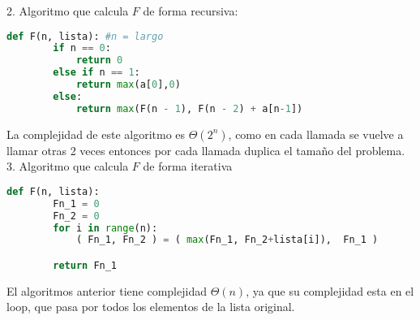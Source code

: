 \documentclass[
	spanish, %
	letterpaper, oneside
]{article}
\begin{document}
2. Algoritmo que calcula $F$ de forma recursiva:

\begin{lstlisting}[language=Python]
    def F(n, lista): #n = largo
        if n == 0:
            return 0
        else if n == 1:
            return max(a[0],0)
        else:
            return max(F(n - 1), F(n - 2) + a[n-1])
\end{lstlisting}

La complejidad de este algoritmo es $\Theta(2^n)$, como en cada llamada se vuelve a llamar otras 2 veces entonces por cada llamada duplica el tamaño del problema.\\


3. Algoritmo que calcula $F$ de forma iterativa

\begin{lstlisting}[language=Python]
    def F(n, lista):
        Fn_1 = 0
        Fn_2 = 0
        for i in range(n):
            ( Fn_1, Fn_2 ) = ( max(Fn_1, Fn_2+lista[i]),  Fn_1 )

        return Fn_1

\end{lstlisting}
El algoritmos anterior tiene complejidad $\Theta(n)$, ya que su complejidad esta en el loop, que pasa por todos los elementos de la lista original.

\end{document}
